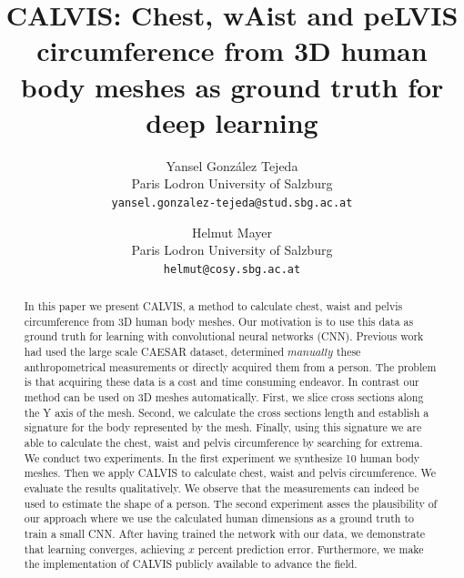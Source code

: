 \documentclass[10pt,twocolumn,letterpaper]{article}
\begin{document}
\title{CALVIS: Chest, wAist and peLVIS circumference from 3D human body meshes 
as ground truth for deep learning}

\author{Yansel González Tejeda\\
Paris Lodron University of Salzburg\\
{\tt\small yansel.gonzalez-tejeda@stud.sbg.ac.at}
\and
Helmut Mayer\\
Paris Lodron University of Salzburg\\
{\tt\small helmut@cosy.sbg.ac.at}
}

\maketitle
\ificcvfinal\thispagestyle{empty}\fi

\begin{abstract}
   In this paper we present CALVIS, a method to calculate chest, waist and 
   pelvis circumference from 3D human body meshes. Our motivation is to use 
   this data as ground truth for learning with convolutional neural networks 
   (CNN). Previous work had used the large scale CAESAR dataset, determined 
   $\textit{manually}$ these anthropometrical measurements or directly acquired 
   them from a person. The problem is that acquiring these data is a cost and 
   time consuming endeavor. In contrast our method can be used on 
   3D meshes automatically. First, we slice cross sections along the Y axis of 
   the mesh. Second, we calculate the cross sections length and establish a 
   signature for the body represented by the mesh. Finally, using this 
   signature we are able to calculate the chest, waist and pelvis 
   circumference by searching for extrema. We conduct two experiments. 
   In the first experiment we synthesize 10 human body meshes. Then we apply 
   CALVIS to calculate chest, waist and pelvis circumference. We evaluate the 
   results qualitatively. We observe that the measurements can indeed be used 
   to estimate the shape of a person. The second experiment asses the 
   plausibility of our approach where we use the calculated human dimensions as 
   a ground truth to train a small CNN. After having trained the network with 
   our data, we demonstrate that learning converges, achieving $x$ percent 
   prediction error. 
   Furthermore, we make the implementation of CALVIS publicly available to 
   advance the field.
\end{abstract}
\end{document}
